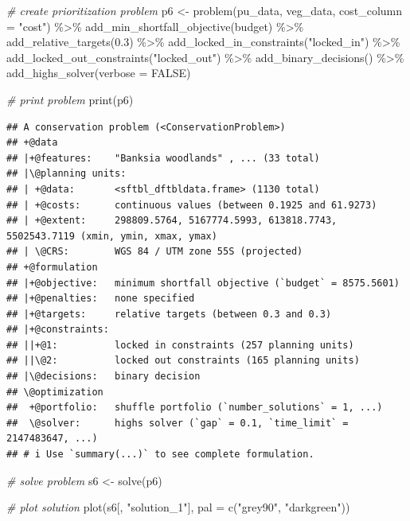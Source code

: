 \documentclass[
  12pt,
]{book}
\newenvironment{Shaded}{\begin{snugshade}}{\end{snugshade}}
\newcommand{\AttributeTok}[1]{\textcolor[rgb]{0.77,0.63,0.00}{#1}}
\newcommand{\CommentTok}[1]{\textcolor[rgb]{0.56,0.35,0.01}{\textit{#1}}}
\newcommand{\ConstantTok}[1]{\textcolor[rgb]{0.00,0.00,0.00}{#1}}
\newcommand{\FloatTok}[1]{\textcolor[rgb]{0.00,0.00,0.81}{#1}}
\newcommand{\FunctionTok}[1]{\textcolor[rgb]{0.00,0.00,0.00}{#1}}
\newcommand{\NormalTok}[1]{#1}
\newcommand{\OtherTok}[1]{\textcolor[rgb]{0.56,0.35,0.01}{#1}}
\newcommand{\SpecialCharTok}[1]{\textcolor[rgb]{0.00,0.00,0.00}{#1}}
\newcommand{\StringTok}[1]{\textcolor[rgb]{0.31,0.60,0.02}{#1}}
\begin{document}
\begin{Shaded}
\begin{Highlighting}[]
\CommentTok{\# create prioritization problem}
\NormalTok{p6 }\OtherTok{\textless{}{-}}
  \FunctionTok{problem}\NormalTok{(pu\_data, veg\_data, }\AttributeTok{cost\_column =} \StringTok{"cost"}\NormalTok{) }\SpecialCharTok{\%\textgreater{}\%}
  \FunctionTok{add\_min\_shortfall\_objective}\NormalTok{(budget) }\SpecialCharTok{\%\textgreater{}\%}
  \FunctionTok{add\_relative\_targets}\NormalTok{(}\FloatTok{0.3}\NormalTok{) }\SpecialCharTok{\%\textgreater{}\%}
  \FunctionTok{add\_locked\_in\_constraints}\NormalTok{(}\StringTok{"locked\_in"}\NormalTok{) }\SpecialCharTok{\%\textgreater{}\%}
  \FunctionTok{add\_locked\_out\_constraints}\NormalTok{(}\StringTok{"locked\_out"}\NormalTok{) }\SpecialCharTok{\%\textgreater{}\%}
  \FunctionTok{add\_binary\_decisions}\NormalTok{() }\SpecialCharTok{\%\textgreater{}\%}
  \FunctionTok{add\_highs\_solver}\NormalTok{(}\AttributeTok{verbose =} \ConstantTok{FALSE}\NormalTok{)}

\CommentTok{\# print problem}
\FunctionTok{print}\NormalTok{(p6)}
\end{Highlighting}
\end{Shaded}

\begin{verbatim}
## A conservation problem (<ConservationProblem>)
## +@data
## |+@features:    "Banksia woodlands" , ... (33 total)
## |\@planning units:
## | +@data:       <sftbl_dftbldata.frame> (1130 total)
## | +@costs:      continuous values (between 0.1925 and 61.9273)
## | +@extent:     298809.5764, 5167774.5993, 613818.7743, 5502543.7119 (xmin, ymin, xmax, ymax)
## | \@CRS:        WGS 84 / UTM zone 55S (projected)
## +@formulation
## |+@objective:   minimum shortfall objective (`budget` = 8575.5601)
## |+@penalties:   none specified
## |+@targets:     relative targets (between 0.3 and 0.3)
## |+@constraints:
## ||+@1:          locked in constraints (257 planning units)
## ||\@2:          locked out constraints (165 planning units)
## |\@decisions:   binary decision
## \@optimization
##  +@portfolio:   shuffle portfolio (`number_solutions` = 1, ...)
##  \@solver:      highs solver (`gap` = 0.1, `time_limit` = 2147483647, ...)
## # i Use `summary(...)` to see complete formulation.
\end{verbatim}

\begin{Shaded}
\begin{Highlighting}[]
\CommentTok{\# solve problem}
\NormalTok{s6 }\OtherTok{\textless{}{-}} \FunctionTok{solve}\NormalTok{(p6)}

\CommentTok{\# plot solution}
\FunctionTok{plot}\NormalTok{(s6[, }\StringTok{"solution\_1"}\NormalTok{], }\AttributeTok{pal =} \FunctionTok{c}\NormalTok{(}\StringTok{"grey90"}\NormalTok{, }\StringTok{"darkgreen"}\NormalTok{))}
\end{Highlighting}
\end{Shaded}
\end{document}

